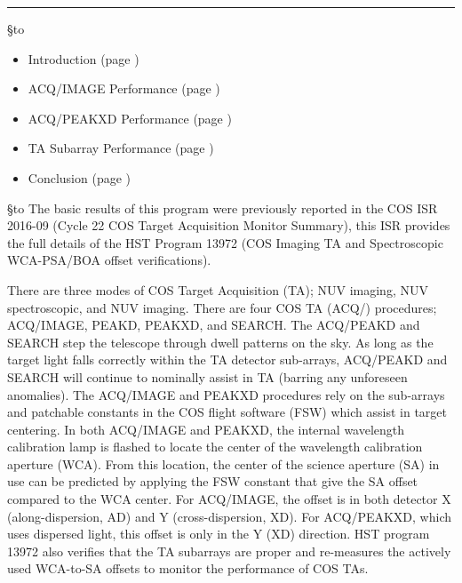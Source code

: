 \documentclass[12pt]{reportj}
\def\ssection#1{\addtocounter{section}{1} \setcounter{subsection}{0} \S*{\hbox to \hsize{\large\bf \arabic{section}. #1\hfill }}}
\def\ssectionstar#1{\S*{\hbox to \hsize{\large\bf #1\hfill}}}
\begin{document}
\vspace{-0.1cm}
\noindent\rule{\linewidth}{1.0pt}
\vspace{-0.3cm}
\ssectionstar{Contents}
\vspace{-0.3cm}

\begin{itemize}
\item Introduction (page \pageref{sec:Introduction})
\item ACQ/IMAGE Performance (page \pageref{sec:acqimage})
\item ACQ/PEAKXD Performance (page \pageref{sec:acqpeakxd})
\item TA Subarray Performance (page \pageref{sec:subarray})
\item Conclusion (page \pageref{sec:theend})
\end{itemize}
\vspace{-0.3cm}
\ssection{Introduction}\label{sec:Introduction}
\vspace{-0.3cm}
The basic results of this program were previously reported in the COS ISR 2016-09 (Cycle 22 COS Target Acquisition Monitor Summary),
this ISR provides the full details of the HST Program 13972 (COS Imaging TA and Spectroscopic WCA-PSA/BOA offset verifications).

There are three modes of COS Target Acquisition (TA); NUV imaging, NUV spectroscopic, and NUV imaging.
There are four COS TA (ACQ/) procedures; ACQ/IMAGE, PEAKD, PEAKXD, and SEARCH. The ACQ/PEAKD and SEARCH
step the telescope through dwell patterns on the sky. As long as the target light falls correctly within
the TA detector sub-arrays, ACQ/PEAKD and SEARCH will continue to nominally assist in TA (barring any
unforeseen anomalies). The ACQ/IMAGE and PEAKXD procedures rely on the sub-arrays and patchable constants
in the COS flight software (FSW) which assist in target centering. In both ACQ/IMAGE and PEAKXD, the internal
wavelength calibration lamp is flashed to locate the center of the wavelength calibration aperture (WCA). From this location, the center of the
science aperture (SA) in use can be predicted by applying the FSW constant that give the SA offset compared to the WCA center. For ACQ/IMAGE,
the offset is in both detector X (along-dispersion, AD) and Y (cross-dispersion, XD). For ACQ/PEAKXD, which
uses dispersed light, this offset is only in the Y (XD) direction. HST program 13972 also verifies that the TA subarrays
are proper and re-measures the actively used WCA-to-SA offsets to monitor the performance of COS TAs.
\end{document}
